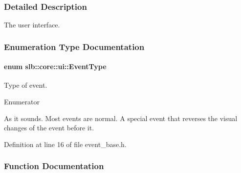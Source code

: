 \subsubsection{Detailed Description}
The user interface. 

\subsubsection{Enumeration Type Documentation}
\paragraph[{\texorpdfstring{Event\+Type}{EventType}}]{\setlength{\rightskip}{0pt plus 5cm}enum {\bf slb\+::core\+::ui\+::\+Event\+Type}\hspace{0.3cm}{\ttfamily [strong]}}\hypertarget{namespaceslb_1_1core_1_1ui_ae44f7078122b3f63928fd619fadd2dcd}{}\label{namespaceslb_1_1core_1_1ui_ae44f7078122b3f63928fd619fadd2dcd}


Type of event. 

\begin{Desc}
\item[Enumerator]\par
\begin{description}
\item[{\em 
H\+I\+D\+E\+\_\+\+L\+A\+S\+T\+\_\+\+E\+V\+E\+NT\hypertarget{namespaceslb_1_1core_1_1ui_ae44f7078122b3f63928fd619fadd2dcdac026b5123133ac2e7603b51574146256}{}\label{namespaceslb_1_1core_1_1ui_ae44f7078122b3f63928fd619fadd2dcdac026b5123133ac2e7603b51574146256}
}]As it sounds. Most events are normal. A special event that reverses the visual changes of the event before it. \end{description}
\end{Desc}


Definition at line 16 of file event\+\_\+base.\+h.



\subsubsection{Function Documentation}
